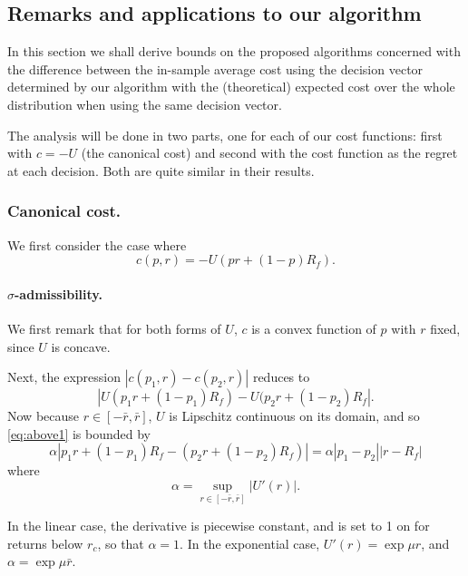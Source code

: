 \subsection{Remarks and applications to our algorithm}

In this section we shall derive bounds on the proposed algorithms concerned with the
difference between the in-sample average cost using the decision vector determined by our
algorithm with the (theoretical) expected cost over the whole distribution when using the
same decision vector. 

The analysis will be done in two parts, one for each of our cost functions: first with
$c=-U$ (the canonical cost) and second with the cost function as the regret at each
decision. Both are quite similar in their results. 

\subsubsection{Canonical cost.}
We first consider the case where 
\begin{equation*}
  c(p,r) = -U(pr + (1-p)R_f).
\end{equation*}

\paragraph{$\sigma$-admissibility.}  We first remark that for both forms of $U$, $c$ is a
convex function of $p$ with $r$ fixed, since $U$ is concave.

Next, the expression $|c(p_1,r)-c(p_2,r)|$ reduces to
\begin{equation}
  \label{eq:above1} |U(p_1r + (1-p_1)R_f) - U(p_2r + (1-p_2)R_f|.
\end{equation} Now because $r\in[-\bar r,\bar r]$, $U$ is Lipschitz continuous on its
domain, and so \eqref{eq:above1} is bounded by
\begin{equation}
  \label{eq:above2} 
  \alpha |p_1r + (1-p_1)R_f - (p_2r + (1-p_2)R_f)| = \alpha|p_1-p_2||r-R_f|
\end{equation} 
where
\begin{equation*} 
  \alpha = \sup_{r\in[-\bar r,\bar r]} |U'(r)|.
\end{equation*}

In the linear case, the derivative is piecewise constant, and is set to 1 on for returns
below $r_c$, so that $\alpha=1$. In the exponential case, $U'(r) = \exp\mu r$, and $\alpha
= \exp \mu \bar r$.

